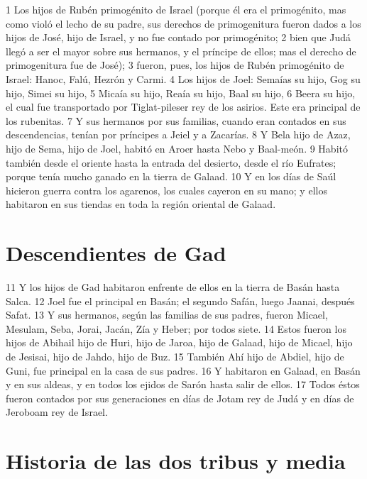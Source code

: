 1 Los hijos de Rubén primogénito de Israel (porque él era el primogénito, mas como violó el lecho de su padre, sus derechos de primogenitura fueron dados a los hijos de José, hijo de Israel, y no fue contado por primogénito;
2 bien que Judá llegó a ser el mayor sobre sus hermanos, y el príncipe de ellos; mas el derecho de primogenitura fue de José);
3 fueron, pues, los hijos de Rubén primogénito de Israel: Hanoc, Falú, Hezrón y Carmi.
4 Los hijos de Joel: Semaías su hijo, Gog su hijo, Simei su hijo,
5 Micaía su hijo, Reaía su hijo, Baal su hijo,
6 Beera su hijo, el cual fue transportado por Tiglat-pileser rey de los asirios. Este era principal de los rubenitas.
7 Y sus hermanos por sus familias, cuando eran contados en sus descendencias, tenían por príncipes a Jeiel y a Zacarías.
8 Y Bela hijo de Azaz, hijo de Sema, hijo de Joel, habitó en Aroer hasta Nebo y Baal-meón.
9 Habitó también desde el oriente hasta la entrada del desierto, desde el río Eufrates; porque tenía mucho ganado en la tierra de Galaad.
10 Y en los días de Saúl hicieron guerra contra los agarenos, los cuales cayeron en su mano; y ellos habitaron en sus tiendas en toda la región oriental de Galaad.
\section*{Descendientes de Gad}

11 Y los hijos de Gad habitaron enfrente de ellos en la tierra de Basán hasta Salca.
12 Joel fue el principal en Basán; el segundo Safán, luego Jaanai, después Safat.
13 Y sus hermanos, según las familias de sus padres, fueron Micael, Mesulam, Seba, Jorai, Jacán, Zía y Heber; por todos siete.
14 Estos fueron los hijos de Abihail hijo de Huri, hijo de Jaroa, hijo de Galaad, hijo de Micael, hijo de Jesisai, hijo de Jahdo, hijo de Buz.
15 También Ahí hijo de Abdiel, hijo de Guni, fue principal en la casa de sus padres.
16 Y habitaron en Galaad, en Basán y en sus aldeas, y en todos los ejidos de Sarón hasta salir de ellos.
17 Todos éstos fueron contados por sus generaciones en días de Jotam rey de Judá y en días de Jeroboam rey de Israel.
\section*{Historia de las dos tribus y media}

